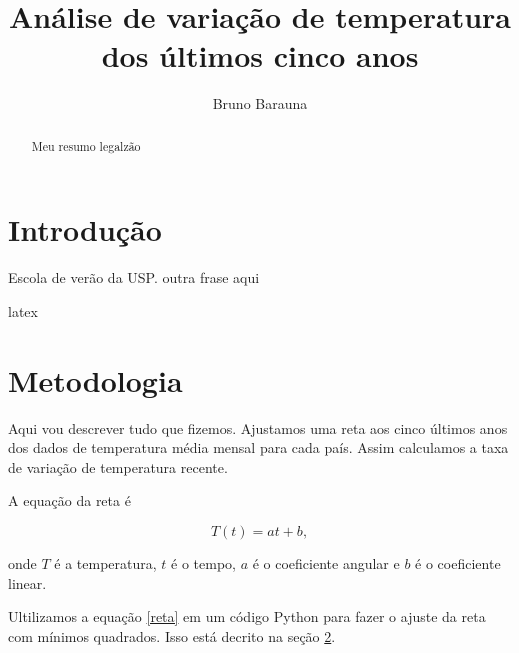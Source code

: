 \documentclass{article}
\begin{document}
\title{Análise de variação de temperatura dos últimos cinco anos}
\author{Bruno Barauna}
\maketitle

\begin{abstract}
Meu resumo legalzão
\end{abstract}

\section{Introdução}

Escola de verão da USP.
outra frase aqui

latex

\section{Metodologia}
\label{sec:metodos}
Aqui vou descrever tudo que fizemos.
Ajustamos uma reta aos cinco últimos anos dos dados
de temperatura média mensal para cada país.
Assim calculamos a taxa de variação de temperatura recente.

A equação da reta é

\begin{equation}
T(t) = a t +b,
\label{eq:reta}
\end{equation}

\noindent
onde $T$ é a temperatura, $t$ é o tempo, $a$ é o coeficiente angular e $b$ é o coeficiente linear.

Ultilizamos a equação \ref{reta} em um código Python para fazer o ajuste da 
reta com mínimos quadrados.
Isso está decrito na seção \ref{sec:metodos}.
\end{document}
